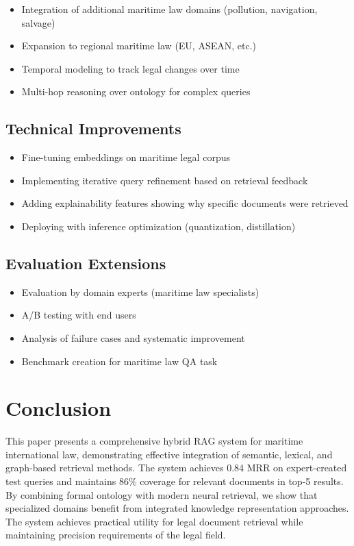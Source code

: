 \documentclass[11pt,a4paper]{article}
\begin{document}
\begin{itemize}
\item Integration of additional maritime law domains (pollution, navigation, salvage)
\item Expansion to regional maritime law (EU, ASEAN, etc.)
\item Temporal modeling to track legal changes over time
\item Multi-hop reasoning over ontology for complex queries
\end{itemize}

\subsection{Technical Improvements}

\begin{itemize}
\item Fine-tuning embeddings on maritime legal corpus
\item Implementing iterative query refinement based on retrieval feedback
\item Adding explainability features showing why specific documents were retrieved
\item Deploying with inference optimization (quantization, distillation)
\end{itemize}

\subsection{Evaluation Extensions}

\begin{itemize}
\item Evaluation by domain experts (maritime law specialists)
\item A/B testing with end users
\item Analysis of failure cases and systematic improvement
\item Benchmark creation for maritime law QA task
\end{itemize}

\section{Conclusion}

This paper presents a comprehensive hybrid RAG system for maritime international law, demonstrating effective integration of semantic, lexical, and graph-based retrieval methods. The system achieves 0.84 MRR on expert-created test queries and maintains 86\% coverage for relevant documents in top-5 results. By combining formal ontology with modern neural retrieval, we show that specialized domains benefit from integrated knowledge representation approaches. The system achieves practical utility for legal document retrieval while maintaining precision requirements of the legal field.
\end{document}
